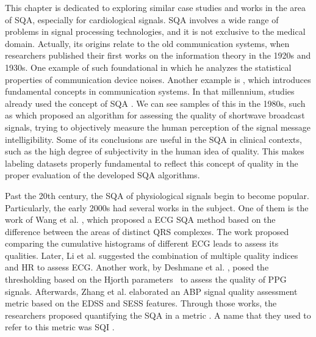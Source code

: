 


This chapter is dedicated to exploring similar case studies and works in the area of \gls{SQA}, especially for cardiological signals. \gls{SQA} involves a wide range of problems in signal processing technologies, and it is not exclusive to the medical domain. Actually, its origins relate to the old communication systems, when researchers published their first works on the information theory 	in the 1920s and 1930s. One example of such foundational  in which he analyzes the statistical properties of communication device noises. Another example is , which introduces fundamental concepts in communication systems. In that millennium, studies already used the concept of \gls{SQA} . We can see samples of this in the 1980s, such as  which proposed an algorithm for assessing the quality of shortwave broadcast signals, trying to objectively measure the human perception of the signal message intelligibility. Some of its conclusions are useful in the \gls{SQA} in clinical contexts, such as the high degree of subjectivity in the human idea of quality. This makes labeling datasets properly fundamental to reflect this concept of quality in the proper evaluation of the developed \gls{SQA} algorithms.
	
Past the 20th century, the \gls{SQA} of physiological signals begin to become popular. Particularly, the early 2000s had several works in the subject. One of them is the work of Wang et al. \cite{2000s-1}, which proposed a \gls{ECG} \gls{SQA} method based on the difference between the areas of distinct QRS complexes. The work proposed comparing the cumulative histograms of different \gls{ECG} leads to assess its qualities. Later,  Li et al. \cite{2000s-2} suggested the combination of multiple quality indices and \gls{HR} to assess \gls{ECG}. Another work, by Deshmane et al. \cite{2000s-3}, posed the thresholding based on the Hjorth parameters~\cite{hjorth-parameters} to assess the quality of \gls{PPG} signals. Afterwards, Zhang et al. \cite{2000s-4} elaborated an \gls{ABP} signal quality assessment metric based on the \gls{EDSS} and \gls{SESS} features. Through those works, the researchers proposed quantifying the \gls{SQA} in a metric \cite{2000s-2, 2000s-3, 2000s-4}. A name that they used to refer to this metric was \gls{SQI} \cite{2000s-2, 2000s-3}.


